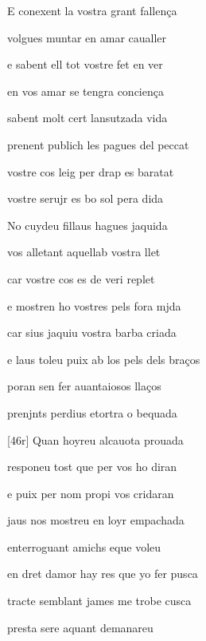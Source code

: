 \documentclass[12pt]{article}
\begin{document}
\begin{estrofa}

 E conexent la vostra grant fallen\c{c}a

 volgues muntar en amar caualler

 e sabent ell tot vostre fet en ver

 en vos amar se tengra concien\c{c}a

 sabent molt cert lansutzada vida

 prenent publich les pagues del peccat

 vostre cos leig per drap es baratat

 vostre serujr es bo sol pera dida

\end{estrofa}



\begin{estrofa}

 No cuydeu fillaus hagues jaquida

 vos alletant aquellab vostra llet

 car vostre cos es de veri replet

 e mostren ho vostres pels fora mjda

 car sius jaquiu vostra barba criada

 e laus toleu puix ab los pels dels bra\c{c}os

 poran sen fer auantaiosos lla\c{c}os

 prenjnts perdius etortra o bequada

\end{estrofa}



\begin{estrofa}

 [46r] Quan hoyreu alcauota prouada

 responeu tost que per vos ho diran

 e puix per nom propi vos cridaran

 jaus nos mostreu en loyr empachada

 enterroguant amichs eque voleu

 en dret damor hay res que yo fer pusca

 tracte semblant james me trobe cusca

 presta sere aquant demanareu

\end{estrofa}
\end{document}
